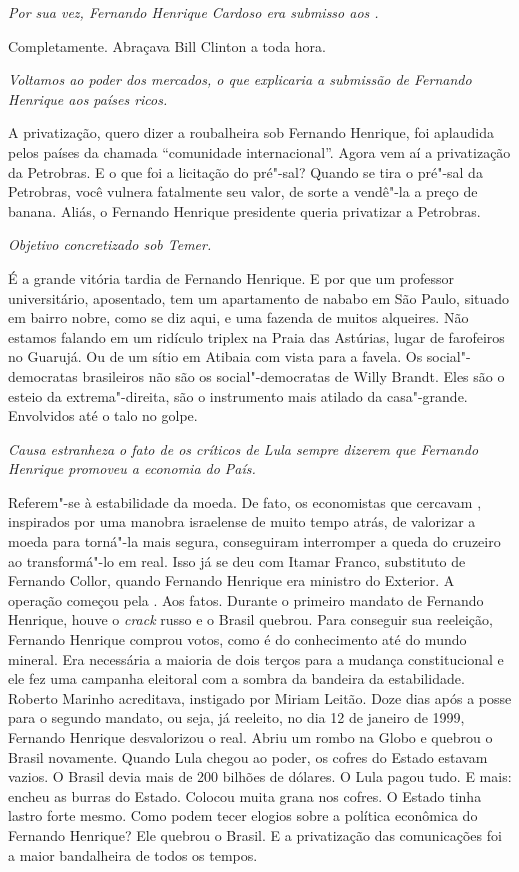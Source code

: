 \itshape
 Por sua vez, Fernando Henrique Cardoso era submisso aos
.

\normalfont 
Completamente. Abraçava Bill Clinton a toda hora.

\itshape
 Voltamos ao poder dos mercados, o que explicaria a
submissão de Fernando Henrique aos países ricos.

\normalfont 
A privatização, quero dizer a roubalheira sob Fernando
Henrique, foi aplaudida pelos países da chamada ``comunidade
internacional''. Agora vem aí a privatização da Petrobras. E o que foi a
licitação do pré"-sal? Quando se tira o pré"-sal da Petrobras, você
vulnera fatalmente seu valor, de sorte a vendê"-la a preço de banana.
Aliás, o Fernando Henrique presidente queria privatizar a Petrobras.

\itshape
 Objetivo concretizado sob Temer.

\normalfont 
É a grande vitória tardia de Fernando Henrique. E por que
um professor universitário, aposentado, tem um apartamento de nababo em
São Paulo, situado em bairro nobre, como se diz aqui, e uma fazenda de
muitos alqueires. Não estamos falando em um ridículo triplex na Praia
das Astúrias, lugar de farofeiros no Guarujá. Ou de um sítio em Atibaia
com vista para a favela. Os social"-democratas brasileiros não são os
social"-democratas de Willy Brandt. Eles são o esteio da extrema"-direita,
são o instrumento mais atilado da casa"-grande. Envolvidos até o talo no
golpe.

\itshape
 Causa estranheza o fato de os críticos de Lula sempre
dizerem que Fernando Henrique promoveu a economia do País.

\normalfont 
Referem"-se à estabilidade da moeda. De fato, os
economistas que cercavam , inspirados por uma manobra israelense de
muito tempo atrás, de valorizar a moeda para torná"-la mais segura,
conseguiram interromper a queda do cruzeiro ao transformá"-lo em real.
Isso já se deu com Itamar Franco, substituto de Fernando Collor, quando
Fernando Henrique era ministro do Exterior. A operação começou pela .
Aos fatos. Durante o primeiro mandato de Fernando Henrique, houve o
\emph{crack} russo e o Brasil quebrou. Para conseguir sua reeleição,
Fernando Henrique comprou votos, como é do conhecimento até do mundo
mineral. Era necessária a maioria de dois terços para a mudança
constitucional e ele fez uma campanha eleitoral com a sombra da bandeira
da estabilidade. Roberto Marinho acreditava, instigado por Miriam
Leitão. Doze dias após a posse para o segundo mandato, ou seja, já
reeleito, no dia 12 de janeiro de 1999, Fernando Henrique desvalorizou o
real. Abriu um rombo na Globo e quebrou o Brasil novamente. Quando Lula
chegou ao poder, os cofres do Estado estavam vazios. O Brasil devia mais
de 200 bilhões de dólares. O Lula pagou tudo. E mais: encheu as burras
do Estado. Colocou muita grana nos cofres. O Estado tinha lastro forte
mesmo. Como podem tecer elogios sobre a política econômica do Fernando
Henrique? Ele quebrou o Brasil. E a privatização das comunicações foi a
maior bandalheira de todos os tempos.

